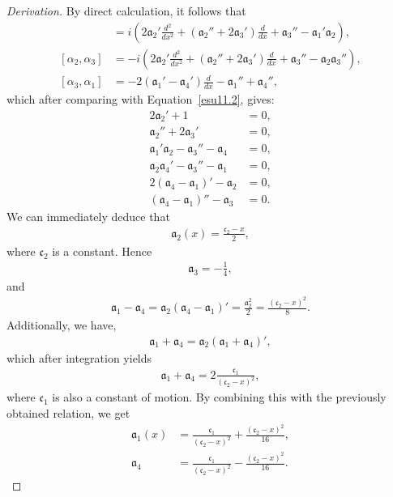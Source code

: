 \documentclass[12pt,a4paper]{report}
\theoremstyle{definition}
\newenvironment{derivation}
  {\renewcommand\qedsymbol{$\square$}\begin{proof}[Derivation]}
  {\end{proof}}
\theoremstyle{remark}
\theoremstyle{remark}
\begin{document}
\begin{derivation}
By direct calculation, it follows that
\begin{align*}
[\alpha_1,\alpha_2]&=i\left(2\mathfrak{a}_2'\frac{d^2}{dx^2}+(\mathfrak{a}_2''+2\mathfrak{a}_3')\frac{d}{dx}+\mathfrak{a}_3''-\mathfrak{a}_1'\mathfrak{a}_2\right),\\
[\alpha_2,\alpha_3]&=-i\left(2\mathfrak{a}_2'\frac{d^2}{dx^2}+(\mathfrak{a}_2''+2\mathfrak{a}_3')\frac{d}{dx}+\mathfrak{a}_3''-\mathfrak{a}_2\mathfrak{a}_3''\right),\\
[\alpha_3,\alpha_1]&=-2(\mathfrak{a}_1'-\mathfrak{a}_4')\frac{d}{dx}-\mathfrak{a}_1''+\mathfrak{a}_4'',
\end{align*}
which after comparing with Equation~\ref{esu11.2}, gives:
\begin{align*}
2\mathfrak{a}_2'+1&=0,\\
\mathfrak{a}_2''+2\mathfrak{a}_3'&=0,\\
\mathfrak{a}_1'\mathfrak{a}_2-\mathfrak{a}_3''-\mathfrak{a}_4&=0,\\
\mathfrak{a}_2\mathfrak{a}_4'-\mathfrak{a}_3''-\mathfrak{a}_1&=0,\\
2(\mathfrak{a}_4-\mathfrak{a}_1)'-\mathfrak{a}_2&=0,\\
(\mathfrak{a}_4-\mathfrak{a}_1)''-\mathfrak{a}_3&=0.
\end{align*}
We can immediately deduce that
\begin{align*}
\mathfrak{a}_2(x)=\frac{\mathfrak{c}_2-x}{2},
\end{align*}
where $\mathfrak{c}_2$ is a constant. Hence
\begin{align*}
\mathfrak{a}_3=-\frac{1}{4},
\end{align*}
and
\begin{align*}
\mathfrak{a}_1-\mathfrak{a}_4=\mathfrak{a}_2(\mathfrak{a}_4-\mathfrak{a}_1)'=\frac{\mathfrak{a}_2^2}{2}=\frac{(\mathfrak{c}_2-x)^2}{8}.
\end{align*}
Additionally, we have,
\begin{align*}
\mathfrak{a}_1+\mathfrak{a}_4=\mathfrak{a}_2(\mathfrak{a}_1+\mathfrak{a}_4)',
\end{align*}
which after integration yields
\begin{align*}
\mathfrak{a}_1+\mathfrak{a}_4=2\frac{\mathfrak{c}_1}{(\mathfrak{c}_2-x)^2},
\end{align*}
where $\mathfrak{c}_1$ is also a constant of motion. By combining this with the previously obtained relation, we get
\begin{align*}
\mathfrak{a}_1(x)&=\frac{\mathfrak{c}_1}{(\mathfrak{c}_2-x)^2}+\frac{(\mathfrak{c}_2-x)^2}{16},\\
\mathfrak{a}_4&=\frac{\mathfrak{c}_1}{(\mathfrak{c}_2-x)^2}-\frac{(\mathfrak{c}_2-x)^2}{16}.
\end{align*}
\end{derivation}
\end{document}
